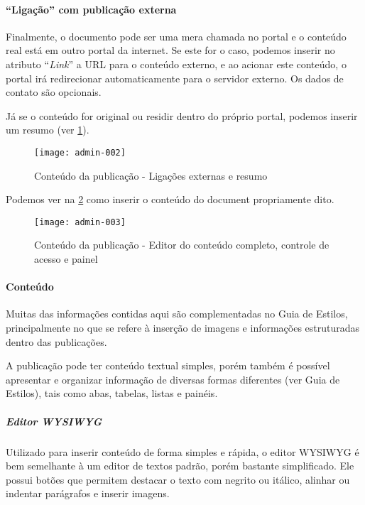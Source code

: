 \paragraph{``Ligação'' com publicação externa}

Finalmente, o documento pode ser uma mera chamada no portal e o conteúdo real está em outro portal da internet. Se este for o caso, podemos inserir no atributo ``\textit{Link}'' a \gls{URL} para o conteúdo externo, e ao acionar este conteúdo, o portal irá redirecionar automaticamente para o servidor externo. Os dados de contato são opcionais.

Já se o conteúdo for original ou residir dentro do próprio portal, podemos inserir um resumo (ver \cref{RS0006:fig:admin-002}).

\begin{figure}[!ht]
    \centering
    \texttt{[image: admin-002]}
    \caption{Conteúdo da publicação - Ligações externas e resumo}\label{RS0006:fig:admin-002}
\end{figure}

Podemos ver na \cref{RS0006:fig:admin-003} como inserir o conteúdo do document propriamente dito.

\begin{figure}[!ht]
    \centering
    \texttt{[image: admin-003]}
    \caption{Conteúdo da publicação - Editor do conteúdo completo, controle de acesso e painel}\label{RS0006:fig:admin-003}
\end{figure}

\paragraph{Conteúdo}

\begin{displayquote}
    Muitas das informações contidas aqui são complementadas no Guia de Estilos, principalmente no que se refere à inserção de imagens e informações estruturadas dentro das publicações.
\end{displayquote}

A publicação pode ter conteúdo textual simples, porém também é possível apresentar e organizar informação de diversas formas diferentes (ver Guia de Estilos), tais como abas, tabelas, listas e painéis.

\subparagraph{Editor WYSIWYG}

Utilizado para inserir conteúdo de forma simples e rápida, o editor \gls{WYSIWYG} é bem semelhante à um editor de textos padrão, porém bastante simplificado. Ele possui botões que permitem destacar o texto com negrito ou itálico, alinhar ou indentar parágrafos e inserir imagens.

